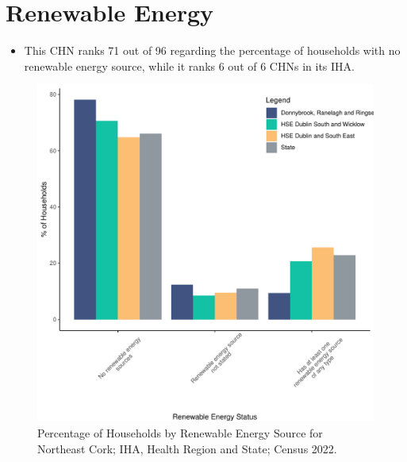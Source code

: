 \documentclass{article}
\begin{document}
\section{Renewable Energy}\label{sect:RE}
\begin{itemize}
\item This CHN ranks  71 out of 96 regarding the percentage of households with no renewable energy source, while it ranks   6 out of 6 CHNs in its IHA.
\end{itemize}
\begin{figure}[H]
	\centering
	\includegraphics[width = 140mm]{../figures/RenewableEnergyED.pdf}
	\caption{Percentage of Households by Renewable Energy Source for Northeast Cork; IHA, Health Region and State; Census 2022.}
	\label{fig:vbnv}
	\end{figure}
\end{document}
